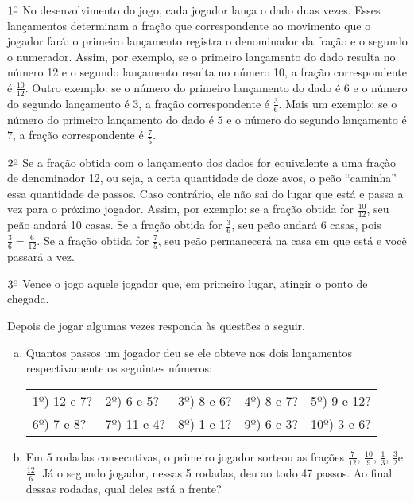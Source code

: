 \begin{atividade}{}
$1^{\textrm{\underline{o}}}$ No desenvolvimento do jogo, cada jogador lança o dado duas vezes. Esses lançamentos determinam a fração que correspondente ao movimento que o jogador fará: o primeiro lançamento registra o denominador da fração e o segundo o numerador. Assim, por exemplo, se o primeiro lançamento do dado resulta no número 12 e o segundo lançamento resulta no número 10, a fração correspondente é $\frac{10}{12}$. Outro exemplo: se o número do primeiro lançamento do dado é $6$ e o número do segundo lançamento é $3$, a fração correspondente é $\frac{3}{6}$. Mais um exemplo: se o número do primeiro lançamento do dado é $5$ e o número do segundo lançamento é $7$, a fração correspondente é $\frac{7}{5}$.

$2^{\textrm{\underline{o}}}$ Se a fração obtida com o lançamento dos dados for equivalente a uma fraçào de denominador 12, ou seja, a certa quantidade de doze avos, o peão ``caminha'' essa quantidade de passos. Caso contrário, ele não sai do lugar que está e passa a vez para o próximo jogador. Assim, por exemplo: se a fração obtida for $\frac{10}{12}$, seu peão andará 10 casas. Se a fração obtida for $\frac{3}{6}$, seu peão andará $6$ casas, pois $\frac{3}{6} = \frac{6}{12}$. Se a fração obtida for $\frac{7}{5}$, seu peão permanecerá na casa em que está e você passará a vez.

$3^{\textrm{\underline{o}}}$ Vence o jogo aquele jogador que, em primeiro lugar, atingir o ponto de chegada.

Depois de jogar algumas vezes responda às questões a seguir.


\begin{enumerate}[a)]
 \item Quantos passos um jogador deu se ele obteve nos dois lançamentos respectivamente os seguintes números:

 \noindent \begin{tabular}{m{}m{}m{}m{}m{}}
1º) 12 e 7?  & 2º) 6 e 5? & 3º) 8 e 6? & 4º) 8 e 7? & 5º) 9 e 12? \\
6º) 7 e 8? & 7º) 11 e 4? & 8º) 1 e 1? & 9º) 6 e 3? & 10º) 3 e 6?
\end{tabular}

\item   Em 5 rodadas consecutivas, o primeiro jogador sorteou as frações  $\frac{7}{12}$, $\frac{10}{9}$, $\frac{1}{3}$, $\frac{3}{2}$e  $\frac{12}{6}$. Já o segundo jogador, nessas 5 rodadas, deu ao todo 47 passos. Ao final dessas rodadas, qual deles está a frente?
\end{enumerate}
\end{atividade}

